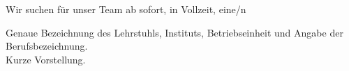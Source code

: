 %
% 
% 
%



\newcommand{\StellenausschreibungAnsprechpartner}{%
    \textbf{\UniversitaetName} \\
    Abteilung \\
    \PersonTitel{} \PersonVorname{} \PersonNachname \\
    \StellenausschreibungAdresse \\
    Tel.~\PersonTelefon \\
    \PersonEmail \\
    \PersonWebseite \\
    \UniversitaetWebseite
}

\toggletrue{StellenausschreibungGrafikOpportunities}

\newcommand{\StellenausschreibungStelle}{Name der Stelle}



Wir suchen für unser Team ab sofort, in Vollzeit, eine/n

\StellenausschreibungHauptueberschrift



Genaue Bezeichnung des Lehrstuhls, Instituts, Betriebseinheit und Angabe der Berufsbezeichnung.\\
Kurze Vorstellung.



